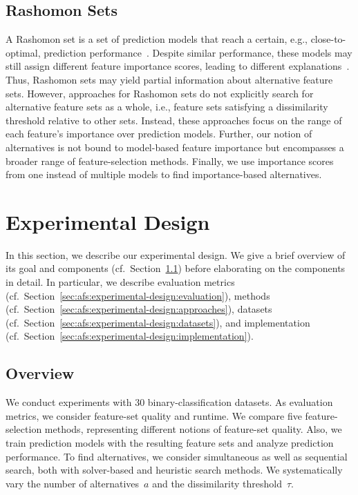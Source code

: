 \documentclass{article}
\theoremstyle{definition}
\begin{document}
\subsection{Rashomon Sets}
\label{sec:afs-related-work:rashomon-sets}

A Rashomon set is a set of prediction models that reach a certain, e.g., close-to-optimal, prediction performance~\cite{fisher2019all}.
Despite similar performance, these models may still assign different feature importance scores, leading to different explanations~\cite{laberge2023partial}.
Thus, Rashomon sets may yield partial information about alternative feature sets.
However, approaches for Rashomon sets do not explicitly search for alternative feature sets as a whole, i.e., feature sets satisfying a dissimilarity threshold relative to other sets.
Instead, these approaches focus on the range of each feature's importance over prediction models.
Further, our notion of alternatives is not bound to model-based feature importance but encompasses a broader range of feature-selection methods.
Finally, we use importance scores from one instead of multiple models to find importance-based alternatives.

\section{Experimental Design}
\label{sec:afs:experimental-design}

In this section, we describe our experimental design.
We give a brief overview of its goal and components (cf.~Section~\ref{sec:afs:experimental-design:overview}) before elaborating on the components in detail.
In particular, we describe evaluation metrics (cf.~Section~\ref{sec:afs:experimental-design:evaluation}), methods (cf.~Section~\ref{sec:afs:experimental-design:approaches}), datasets (cf.~Section~\ref{sec:afs:experimental-design:datasets}), and implementation (cf.~Section~\ref{sec:afs:experimental-design:implementation}).

\subsection{Overview}
\label{sec:afs:experimental-design:overview}

We conduct experiments with 30 binary-classification datasets.
As evaluation metrics, we consider feature-set quality and runtime.
We compare five feature-selection methods, representing different notions of feature-set quality.
Also, we train prediction models with the resulting feature sets and analyze prediction performance.
To find alternatives, we consider simultaneous as well as sequential search, both with solver-based and heuristic search methods.
We systematically vary the number of alternatives~$a$ and the dissimilarity threshold~$\tau$.
\end{document}
